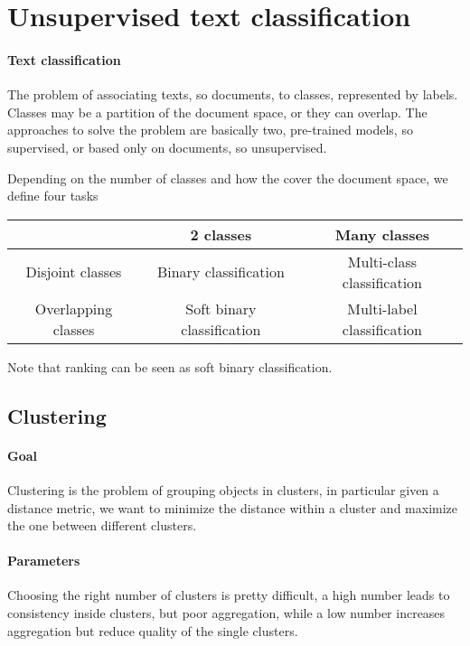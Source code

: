 \section{Unsupervised text classification}

\paragraph{Text classification}
The problem of associating texts, so documents, to classes, represented by labels.
Classes may be a partition of the document space, or they can overlap.
The approaches to solve the problem are basically two, pre-trained models, 
so supervised, or based only on documents, so unsupervised.

Depending on the number of classes and how the cover the document space, we define 
four tasks
\begin{center}
    \begin{tabular}{c | c |c}
            & 2 classes & Many classes\\
            \hline
            Disjoint classes & Binary classification & Multi-class classification\\
            \hline
            Overlapping classes & Soft binary classification & Multi-label classification\\
    \end{tabular}
\end{center}

Note that ranking can be seen as soft binary classification.

\subsection{Clustering}

\paragraph{Goal}
Clustering is the problem of grouping objects in clusters, in particular
given a distance metric, 
we want to minimize the distance within a cluster and maximize the one
between different clusters.

\paragraph{Parameters}
Choosing the right number of clusters is pretty difficult, a high number 
leads to consistency inside clusters, but poor aggregation, while a low number 
increases aggregation but reduce quality of the single clusters.

